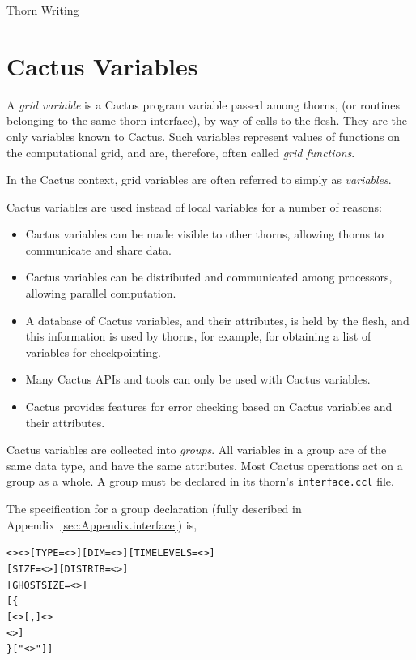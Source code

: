 \begin{cactuspart}{Thorn Writing}

\section{Cactus Variables}
\label{chap:cactus_variables}

A \textit{grid variable} is a Cactus program variable passed among thorns,
(or routines belonging to the same thorn interface),
by way of calls to the flesh.
They are the only variables known to Cactus.
Such variables represent values of functions on the computational grid,
and are, therefore, often called \textit{grid functions}.

In the Cactus context, grid variables are often referred
to simply as \textit{variables}.

Cactus variables are used instead of local variables for a number of reasons:
\begin{itemize}
\item Cactus variables can be made visible to other thorns, allowing
      thorns to communicate and share data.
\item Cactus variables can be distributed and communicated
      among processors, allowing parallel computation.
\item A database of Cactus variables, and their attributes, is held by
      the flesh, and this information is used by thorns, for example, for
      obtaining a list of variables for checkpointing.
\item Many Cactus APIs and tools can only be used with Cactus variables.
\item Cactus provides features for error checking based on Cactus variables
      and their attributes.
\end{itemize}

Cactus variables are collected into \textit{groups}.  All variables in a
group are of the same data type, and have the same attributes. Most Cactus
operations act on a group as a whole.  A group must be declared in its
thorn's \texttt{interface.ccl} file.

The specification for a group declaration
(fully described in Appendix~\ref{sec:Appendix.interface}) is,

\begin{alltt}
<> <> [TYPE=<>] [DIM=<>] [TIMELEVELS=<>]
   [SIZE=<>] [DISTRIB=<>]
   [GHOSTSIZE=<>]
[\{
 [ <>[,]<>
   <> ]
\} ["<>"] ]
\end{alltt}


\end{cactuspart}
